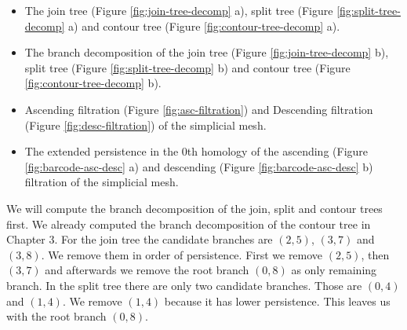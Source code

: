 \begin{itemize}

    \item The join tree (Figure \ref{fig:join-tree-decomp} a), split tree (Figure \ref{fig:split-tree-decomp} a) and contour tree (Figure \ref{fig:contour-tree-decomp} a).

    \item The branch decomposition of the join tree (Figure \ref{fig:join-tree-decomp} b), split tree (Figure \ref{fig:split-tree-decomp} b) and contour tree (Figure \ref{fig:contour-tree-decomp} b).

    \item Ascending filtration (Figure \ref{fig:asc-filtration}) and Descending filtration (Figure \ref{fig:desc-filtration}) of the simplicial mesh.


    \item The extended persistence in the 0th homology of the ascending (Figure \ref{fig:barcode-asc-desc} a) and descending (Figure \ref{fig:barcode-asc-desc} b) filtration of the simplicial mesh.


\end{itemize}

We will compute the branch decomposition of the join, split and contour trees first. We already computed the branch decomposition of the contour tree in Chapter 3. For the join tree the candidate branches are $(2, 5)$, $(3, 7)$ and $(3, 8)$. We remove them in order of persistence. First we remove $(2, 5)$, then $(3, 7)$ and afterwards we remove the root branch $(0, 8)$ as only remaining branch. In the split tree there are only two candidate branches. Those are $(0, 4)$ and $(1, 4)$. We remove $(1, 4)$ because it has lower persistence. This leaves us with the root branch $(0, 8)$.


